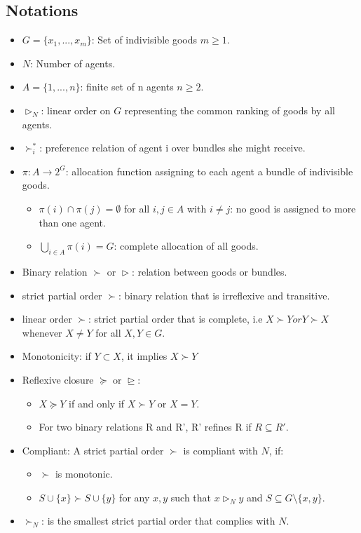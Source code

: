 \documentclass[12pt,a4paper]{article}
\begin{document}
\subsection*{Notations}
\begin{itemize}
    \item $G = \{x_1, ..., x_m\}$: Set of indivisible goods $m \geq 1$.
    \item $N$: Number of agents.
    \item $A = \{1, ..., n\}$: finite set of n agents $n \geq 2$.
    \item $\vartriangleright_N$: linear order on $G$ representing the common ranking of goods by all agents.
    \item $\succ_i^*$: preference relation of agent i over bundles she might receive.
    \item $\pi : A \rightarrow 2^G$: allocation function assigning to each agent a bundle of indivisible goods.
    \begin{itemize}
        \item $\pi(i)\cap \pi(j) = \emptyset$ for all $i,j \in A$ with $i \neq j$: no good is assigned to more than one agent.
        \item $\bigcup_{i \in A} \pi(i) = G$: complete allocation of all goods.
    \end{itemize} 
    \item Binary relation $\succ$ or $\vartriangleright$: relation between goods or bundles.
    \item strict partial order $\succ$: binary relation that is irreflexive and transitive.
    \item linear order $\succ$: strict partial order that is complete, i.e $X \succ Y or Y \succ X$ whenever $X \neq Y$ for all $X,Y \in G$.
    \item Monotonicity: if $Y \subset X$, it implies $X \succ Y$
    \item Reflexive closure $\succeq$ or $\trianglerighteq$: 
    \begin{itemize}
        \item $X \succeq Y$ if and only if $X \succ Y$ or $X = Y$.
        \item For two binary relations R and R', R' refines R if $ R \subseteq R'$.
    \end{itemize}
    \item Compliant: A strict partial order $\succ$ is compliant with $N$, if:
    \begin{itemize}
        \item $\succ$ is monotonic.
        \item $S \cup \{x\} \succ S \cup \{y\}$ for any $x, y$ such that $x \vartriangleright_N y$ and $S \subseteq G \setminus \{x,y\}$.
    \end{itemize}
    \item $\succ_N$: is the smallest strict partial order that complies with $N$.
\end{itemize}
\end{document}
